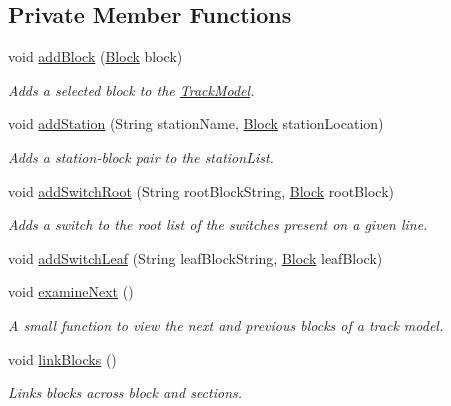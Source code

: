 \subsection*{Private Member Functions}
\begin{DoxyCompactItemize}
\item 
void \hyperlink{classTrackModel_1_1TrackModel_aeeec35a2eb38afc82b87fd310f161e9e}{add\+Block} (\hyperlink{classTrackModel_1_1Block}{Block} block)
\begin{DoxyCompactList}\small\item\em Adds a selected block to the \hyperlink{classTrackModel_1_1TrackModel}{Track\+Model}. \end{DoxyCompactList}\item 
void \hyperlink{classTrackModel_1_1TrackModel_a4c6034df7cc2dc75d516b49b2836d30b}{add\+Station} (String station\+Name, \hyperlink{classTrackModel_1_1Block}{Block} station\+Location)
\begin{DoxyCompactList}\small\item\em Adds a station-\/block pair to the station\+List. \end{DoxyCompactList}\item 
void \hyperlink{classTrackModel_1_1TrackModel_ab7bbc240d2612ca3709889f75cf1d40e}{add\+Switch\+Root} (String root\+Block\+String, \hyperlink{classTrackModel_1_1Block}{Block} root\+Block)
\begin{DoxyCompactList}\small\item\em Adds a switch to the root list of the switches present on a given line. \end{DoxyCompactList}\item 
void \hyperlink{classTrackModel_1_1TrackModel_acf1825e32611df62702740caddbb3698}{add\+Switch\+Leaf} (String leaf\+Block\+String, \hyperlink{classTrackModel_1_1Block}{Block} leaf\+Block)
\item 
void \hyperlink{classTrackModel_1_1TrackModel_a70726fc21e809d98f488fe5b80db7631}{examine\+Next} ()
\begin{DoxyCompactList}\small\item\em A small function to view the next and previous blocks of a track model. \end{DoxyCompactList}\item 
void \hyperlink{classTrackModel_1_1TrackModel_a8a320bcb2c2272eb52e05a022f6d4a9c}{link\+Blocks} ()
\begin{DoxyCompactList}\small\item\em Links blocks across block and sections. \end{DoxyCompactList}\item 

\end{DoxyCompactItemize}
